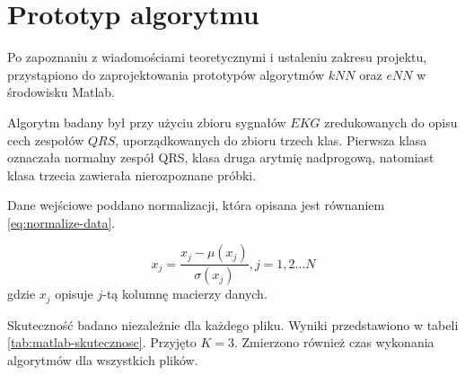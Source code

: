 \section{Prototyp algorytmu}
Po zapoznaniu z wiadomościami teoretycznymi i ustaleniu zakresu projektu, przystąpiono do zaprojektowania prototypów algorytmów $kNN$ oraz $eNN$ w środowisku Matlab.

Algorytm badany był przy użyciu zbioru sygnałów $EKG$ zredukowanych do opisu cech zespołów $QRS$, uporządkowanych do zbioru trzech klas. Pierwsza klasa oznaczała normalny zespół QRS, klasa druga arytmię nadprogową, natomiast klasa trzecia zawierała nierozpoznane próbki. 

Dane wejściowe poddano normalizacji, która opisana jest równaniem \ref{eq:normalize-data}.

\begin{equation}
\label{eq:normalize-data}
x_j = \frac{x_j - \mu(x_j)}{\sigma(x_j)}, j=1,2...N
\end{equation}
gdzie $x_j$ opisuje $j$-tą kolumnę macierzy danych.

Skuteczność badano niezależnie dla każdego pliku. Wyniki przedstawiono w tabeli \ref{tab:matlab-skutecznosc}. Przyjęto $K=3$. Zmierzono również czas wykonania algorytmów dla wszystkich plików.


